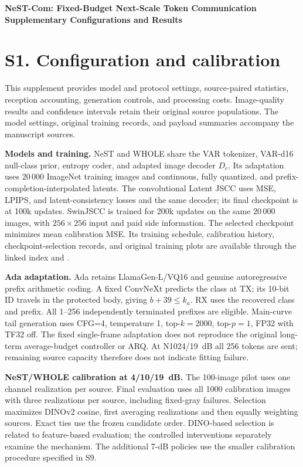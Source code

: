 \documentclass[11pt,letterpaper]{article}
\newcommand{\Dc}{D_c}
\begin{document}
\begin{center}\Large\bfseries NeST-Com: Fixed-Budget Next-Scale Token Communication\\[4pt]\large Supplementary Configurations and Results\end{center}
\section*{S1. Configuration and calibration}
This supplement provides model and protocol settings, source-paired statistics, reception accounting, generation controls, and processing costs. Image-quality results and confidence intervals retain their original source populations. The model settings, original training records, and payload summaries accompany the manuscript sources.

\textbf{Models and training.} NeST and WHOLE share the VAR tokenizer, VAR-d16 null-class prior, entropy coder, and adapted image decoder $\Dc$. Its adaptation uses 20\,000 ImageNet training images and continuous, fully quantized, and prefix-completion-interpolated latents. The convolutional Latent JSCC uses MSE, LPIPS, and latent-consistency losses and the same decoder; its final checkpoint is at 100k updates. SwinJSCC is trained for 200k updates on the same 20\,000 images, with $256\times256$ input and paid side information. The selected checkpoint minimizes mean calibration MSE. Its training schedule, calibration history, checkpoint-selection records, and original training plots are available through the linked index and .

\textbf{Ada adaptation.} Ada retains LlamaGen-L/VQ16 and genuine autoregressive prefix arithmetic coding. A fixed ConvNeXt predicts the class at TX; its 10-bit ID travels in the protected body, giving $b+39\leq k_a$. RX uses the recovered class and prefix. All 1--256 independently terminated prefixes are eligible. Main-curve tail generation uses CFG=4, temperature 1, top-$k=2000$, top-$p=1$, FP32 with TF32 off. The fixed single-frame adaptation does not reproduce the original long-term average-budget controller or ARQ. At N1024/19~dB all 256 tokens are sent; remaining source capacity therefore does not indicate fitting failure.

\textbf{NeST/WHOLE calibration at 4/10/19~dB.} The 100-image pilot uses one channel realization per source. Final evaluation uses all 1000 calibration images with three realizations per source, including fixed-gray failures. Selection maximizes DINOv2 cosine, first averaging realizations and then equally weighting sources. Exact ties use the frozen candidate order. DINO-based selection is related to feature-based evaluation; the controlled interventions separately examine the mechanism. The additional 7-dB policies use the smaller calibration procedure specified in S9.
\end{document}
